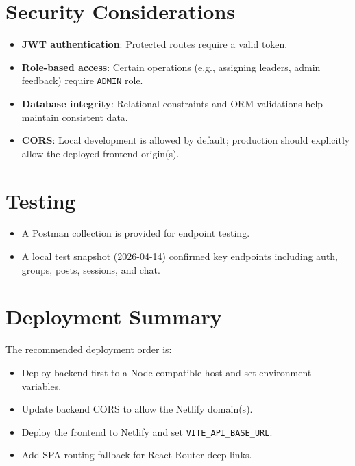 \documentclass[12pt]{article}
\begin{document}
\section{Security Considerations}
\begin{itemize}
  \item \textbf{JWT authentication}: Protected routes require a valid token.
  \item \textbf{Role-based access}: Certain operations (e.g., assigning leaders, admin feedback) require \texttt{ADMIN} role.
  \item \textbf{Database integrity}: Relational constraints and ORM validations help maintain consistent data.
  \item \textbf{CORS}: Local development is allowed by default; production should explicitly allow the deployed frontend origin(s).
\end{itemize}

\section{Testing}
\begin{itemize}
  \item A Postman collection is provided for endpoint testing.
  \item A local test snapshot (2026-04-14) confirmed key endpoints including auth, groups, posts, sessions, and chat.
\end{itemize}

\section{Deployment Summary}
The recommended deployment order is:
\begin{itemize}
  \item Deploy backend first to a Node-compatible host and set environment variables.
  \item Update backend CORS to allow the Netlify domain(s).
  \item Deploy the frontend to Netlify and set \texttt{VITE\_API\_BASE\_URL}.
  \item Add SPA routing fallback for React Router deep links.
\end{itemize}
\end{document}
